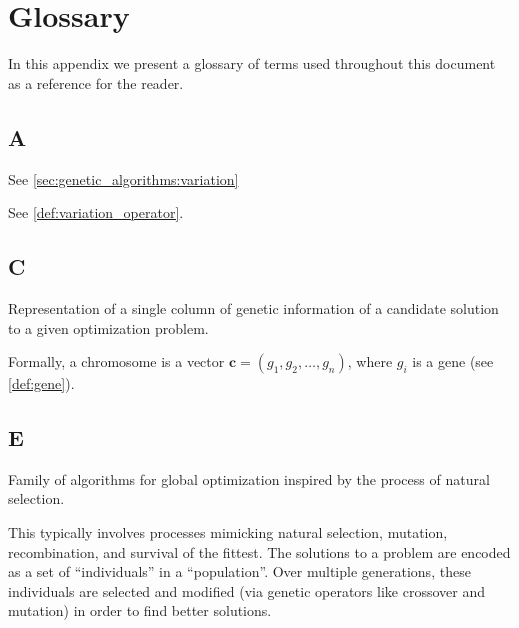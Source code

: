 \chapter{Glossary}
\label{appendix:glossary}
  In this appendix we present a glossary of terms used throughout this document as a reference for
  the reader.

  \section*{A}
    \begin{definition}[Alteration]
    \label{def:alteration}
      See \vref{sec:genetic_algorithms:variation}
    \end{definition}

    \begin{definition}[Alterer]
    \label{def:alterer}
      See \vref{def:variation_operator}.
    \end{definition}

  \section*{C}
    \begin{definition}[Chromosome]
    \label{def:chromosome}
      Representation of a single column of genetic information of a candidate solution to a given
      optimization problem.

      Formally, a chromosome is a vector \(\textbf{c} = (g_1, g_2, \dots, g_n)\), where \(g_i\) is a
      gene (see \vref{def:gene}).
    \end{definition}

  \section*{E}
    \begin{definition}
    \label{def:evolutionary_computation}
      Family of algorithms for global optimization inspired by the process of natural selection.

      This typically involves processes mimicking natural selection, mutation, recombination, and 
      survival of the fittest. 
      The solutions to a problem are encoded as a set of \enquote{individuals} in a 
      \enquote{population}. 
      Over multiple generations, these individuals are selected and modified (via genetic operators 
      like crossover and mutation) in order to find better solutions.
    \end{definition}
    
